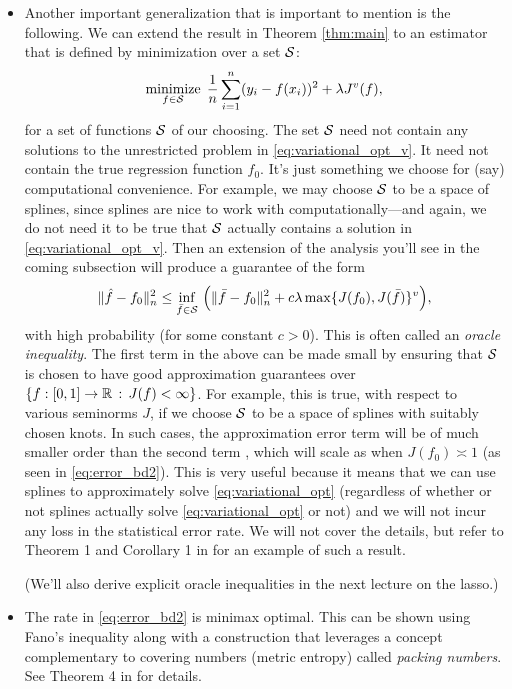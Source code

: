 \documentclass{article}
\begin{document}
\begin{itemize}
\item Another important generalization that is important to mention is the
  following. We can extend the result in Theorem \ref{thm:main} to an estimator
  that is defined by minimization over a set $\mathcal{S}$:
  \[
  \mathop{\mathrm{minimize}}_{f \in \mathcal{S}} \; \frac{1}{n} \sum_{i=1}^n (y_i - f(x_i))^2 + \lambda
  J^v(f),  
  \]
  for a set of functions $\mathcal{S}$ of our choosing. The set $\mathcal{S}$ need not contain
  any solutions to the unrestricted problem in \eqref{eq:variational_opt_v}. It 
  need not contain the true regression function $f_0$. It's just something we
  choose for (say) computational convenience. For example, we may choose $\mathcal{S}$
  to be a space of splines, since splines are nice to work with
  computationally---and again, we do not need it to be true that $\mathcal{S}$ actually
  contains a solution in \eqref{eq:variational_opt_v}. Then an extension of the
  analysis you'll see in the coming subsection will produce a guarantee of the
  form
  \[
  \|\hat{f} - f_0\|_n^2 \leq \inf_{\bar{f} \in \mathcal{S}} \, \Big( \|\bar{f} - f_0\|_n^2
  + c \lambda \max\{ J(f_0),  J(\bar{f}) \}^v \Big),
  \]
  with high probability (for some constant $c>0$). This is often called an 
  \emph{oracle inequality}. The first term in the above  can be made small by ensuring that $\mathcal{S}$ is chosen to have good
  approximation guarantees over $\{ f : [0,1] \to \mathbb{R} \,:\, J(f) < \infty\}$. For
  example, this is true, with respect to various seminorms $J$, if we choose
  $\mathcal{S}$ to be a space of splines with suitably chosen knots. In such cases, the 
  approximation error term  will be of much
  smaller order than the second term , which will scale as  when $J(f_0) \asymp 1$
  (as seen in \eqref{eq:error_bd2}). This is very useful because it means that
  we can use splines to approximately solve \eqref{eq:variational_opt}
  (regardless of whether or not splines actually solve
  \eqref{eq:variational_opt} or not) and we will not incur any loss in the 
  statistical error rate. We will not cover the details, but refer to Theorem 1
  and Corollary 1 in \citet{sadhanala2019additive} for an example of such a
  result.       

  (We'll also derive explicit oracle inequalities in the next lecture on the
  lasso.)  

\item The rate in \eqref{eq:error_bd2} is minimax optimal. This can be shown
  using Fano's inequality along with a construction that leverages a concept 
  complementary to covering numbers (metric entropy) called \emph{packing
    numbers}. See Theorem 4 in \citet{sadhanala2019additive} for details.  
\end{itemize}
\end{document}
